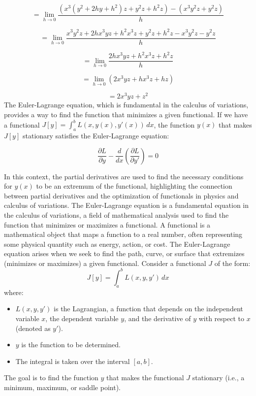 \documentclass[12pt]{article}
\begin{document}
\[
= \lim_{h \to 0} \frac{(x^3 (y^2 + 2hy + h^2) z + y^2 z + h^2 z) - (x^3 y^2 z + y^2 z)}{h}
\]

\[
= \lim_{h \to 0} \frac{x^3 y^2 z + 2hx^3 yz + h^2 x^3 z + y^2 z + h^2 z - x^3 y^2 z - y^2 z}{h}
\]

\[
= \lim_{h \to 0} \frac{2hx^3 yz + h^2 x^3 z + h^2 z}{h}
\]

\[
= \lim_{h \to 0} \left(2x^3 yz + h x^3 z + h z \right)
\]

\[
= 2x^3 yz + z^2
\]
\newpage
The Euler-Lagrange equation, which is fundamental in the calculus of variations, provides a way to find the function that minimizes a given functional. If we have a functional \( J[y] = \int_{a}^{b} L(x, y(x), y'(x)) \, dx \), the function \( y(x) \) that makes \( J[y] \) stationary satisfies the Euler-Lagrange equation:

\[
\frac{\partial L}{\partial y} - \frac{d}{dx} \left( \frac{\partial L}{\partial y'} \right) = 0
\]

In this context, the partial derivatives are used to find the necessary conditions for \( y(x) \) to be an extremum of the functional, highlighting the connection between partial derivatives and the optimization of functionals in physics and calculus of variations.
The Euler-Lagrange equation is a fundamental equation in the calculus of variations, a field of mathematical analysis used to find the function that minimizes or maximizes a functional. A functional is a mathematical object that maps a function to a real number, often representing some physical quantity such as energy, action, or cost. The Euler-Lagrange equation arises when we seek to find the path, curve, or surface that extremizes (minimizes or maximizes) a given functional. Consider a functional \( J \) of the form:
\[
J[y] = \int_{a}^{b} L(x, y, y') \, dx
\]
where:
\begin{itemize}
    \item \( L(x, y, y') \) is the Lagrangian, a function that depends on the independent variable \( x \), the dependent variable \( y \), and the derivative of \( y \) with respect to \( x \) (denoted as \( y' \)).
    \item \( y \) is the function to be determined.
    \item The integral is taken over the interval \([a, b]\).
\end{itemize}

The goal is to find the function \( y \) that makes the functional \( J \) stationary (i.e., a minimum, maximum, or saddle point).
\end{document}

